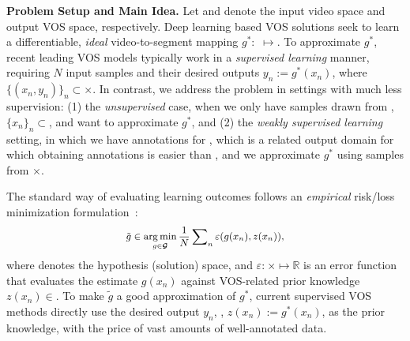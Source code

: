 \documentclass[10pt,twocolumn,letterpaper]{article}
\begin{document}
\noindent\textbf{Problem Setup and Main Idea.}
Let  and  denote the input video space and output VOS space, respectively. Deep learning based VOS solutions seek to learn a differentiable, \textit{ideal} video-to-segment mapping $g^*\!\!\!:\!$ $\mapsto$. To approximate $g^{*\!}$, recent leading VOS models typically work in a \textit{supervised learning} manner, requiring $N$ input
samples and their desired outputs $y_n\!\!:=\!g^{*\!}(x_n)$, where
$\{(x_n,
y_n)\}_{n\!}\!\subset$$\times$. In contrast, we address the problem in settings with much less supervision: (1) the \textit{unsupervised} case, when we only have samples drawn from  , $\{x_n\}_{n\!}\!\subset$, and want to approximate $g^*$, and (2) the
\textit{weakly supervised learning} setting, in which  we have annotations for
, which  is a related output domain for which obtaining
annotations is easier than , and we approximate $g^{*}$ using samples from
$\times$. 

The standard way of evaluating learning outcomes follows an \textit{empirical} risk/loss minimization formulation~\!\cite{Shen_2018_CVPR}:
\vspace{-5pt}
\begin{equation}\small
\tilde{g}\in\mathop{\arg\min}_{g\in\bm{\mathcal{G}}} \frac{1}{N}\sum\nolimits_n\varepsilon(g(x_n),z(x_n)),
\vspace{-0pt}
\end{equation}
where  denotes the hypothesis (solution) space, and $\varepsilon\!\!:$$_{\!}$$\times$$\mapsto\!\!\mathbb{R}$ is an error function that evaluates the estimate $g(x_n)$ against VOS-related prior knowledge $z(x_n)\!\!\in$. To make $\tilde{g}$  a good approximation of $g^{*\!}$, current supervised VOS methods directly use the desired output $y_n$, \ie, $z(x_n)\!\!:=\!\!g^{*\!}(x_n)$, as the prior knowledge, with the price of vast amounts of well-annotated data.
\end{document}

